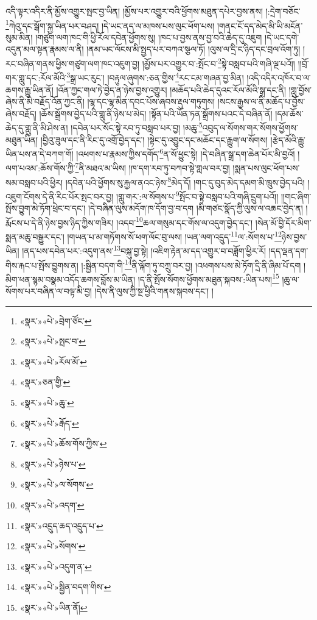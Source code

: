 འདི་ལྟར་འདིར་ནི་མྱོས་འགྱུར་སྤང་བྱ་ཡིན། །མྱོས་པར་འགྱུར་བའི་ཕྱོགས་མཐུན་དཔེར་བྱས་ནས། །:དྲེག་བཅོང་\footnote{«སྣར་»«པེ་»བྲེག་ཙོང་}ཀེའུ་དང་སྒོག་སྐྱ་ཡིན་པར་བཤད། །དེ་ཡང་ནད་ལ་མཁས་པས་ལུང་ཕོག་པས། །གནང་ངོ་དད་མེད་མི་ཡི་མངོན་སུམ་མིན། །གཙུག་ལག་ཁང་གི་ཕྱི་རོལ་དབེན་ཕྱོགས་སུ། །ཁང་པ་བྱས་ནས་བྱ་བའི་ཆེད་དུ་འཇུག །དེ་ཡང་དགེ་འདུན་མལ་སྟན་རྣམས་ལ་ནི། །ནམ་ཡང་ལོངས་མི་སྤྱད་པར་བཀའ་སྩལ་ཏོ། །ལུས་ལ་དྲི་ང་ཉིད་དང་བྲལ་འོག་ཏུ། །རང་བཞིན་གནས་ཕྱིས་གཙུག་ལག་ཁང་འཇུག་བྱ། །མྱོས་པར་འགྱུར་བ་:སྤོང་བ་\footnote{«སྣར་»«པེ་»སྤང་བ་}སྟེ་བསླབ་པའི་གཞི་ལྔ་པའོ།། །།བྲོ་གར་གླུ་དང་:རོལ་མོའི་\footnote{«སྣར་»«པེ་»རོལ་མོ་}སྒྲ་ཡང་རུང་། །བརྟུལ་ཞུགས་:ཅན་གྱིས་\footnote{«སྣར་»ཅན་གྱི་}རང་ངམ་གཞན་བྱ་མིན། །འདི་འདིར་འཁོར་བ་ལ་ཆགས་རྒྱུ་ཡིན་ནོ། །འོན་ཀྱང་གལ་ཏེ་བྱེད་ན་ཉེས་བྱས་འགྱུར། །མཆོད་པའི་ཆེད་དུའང་རོལ་མོའི་སྒྲ་དང་ནི། །གླུ་བྱོས་ཞེས་ནི་མི་བརྗོད་འོན་ཀྱང་ནི། །ལྷ་དང་ལྷ་མིན་དབང་པོས་ཞབས་རྡུལ་གཏུགས། །སངས་རྒྱས་ལ་ནི་མཆོད་པ་བྱོས་ཞེས་བརྗོད། །ཆོས་སྒྲོགས་བྱེད་པའི་གླུ་ནི་ཉེས་པ་མེད། །སྟོན་པའི་ཡོན་ཏན་སྒྲོགས་པའང་དེ་བཞིན་ནོ། །དམ་ཆོས་ཆེད་དུ་གླུ་ནི་མི་ཤེས་ན། །དབེན་པར་སོང་སྟེ་རབ་ཏུ་བསླབ་པར་བྱ། །མཆུ་\footnote{«སྣར་»«པེ་»ཆུ་}འབུད་ལ་སོགས་གར་སོགས་ཕྱོགས་མཐུན་ཡིན། །བྱིའུ་ཟུལ་དང་ནི་རིང་དུ་འགྲོ་བྱེད་དང་། །སྟེང་དུ་འབྱུང་དང་མཆོང་དང་རྒྱུག་ལ་སོགས། །རྩེད་མོའི་རྒྱུ་ཡིན་པས་ན་དེ་བཀག་གོ། །འཕགས་པ་རྣམས་ཀྱིས་དགོད་\footnote{«སྣར་»«པེ་»རྒོད་}ན་སོ་ཕྱུང་སྟེ། །དེ་བཞིན་སྒྲ་དག་ཆེན་པོར་མི་བྱའོ། །ལག་པའམ་:ཆོས་གོས་ཀྱི་\footnote{«སྣར་»«པེ་»ཆོས་གོས་ཀྱིས་}ནི་མཐའ་མ་ཡིས། །ཁ་དག་རབ་ཏུ་བཀབ་སྟེ་གླལ་བར་བྱ། །སྨན་པས་ལུང་ཕོག་པས་སམ་བསླབ་པའི་ཕྱིར། །དབེན་པའི་ཕྱོགས་སུ་རྐྱལ་ནའང་ཉེས་\footnote{«སྣར་»«པེ་»ཉེས་པ་}མེད་དོ། །གང་དུ་བུད་མེད་དམག་མི་ཁྲུས་བྱེད་པའི། །འཇུག་ངོགས་དེ་ནི་རིང་པོར་སྤང་བར་བྱ། །གླུ་གར་:ལ་སོགས་པ་\footnote{«སྣར་»«པེ་»ལ་སོགས་}སྤོང་བ་སྟེ་བསླབ་པའི་གཞི་དྲུག་པའོ།། །།གང་ཞིག་སྤོས་བྱུག་མེ་ཏོག་ཕྲེང་བ་དང་། །དེ་བཞིན་ལུས་མདོག་ཁ་དོག་བྱ་བ་དག །མི་གཙང་སྣོད་ཀྱི་ལུས་ལ་འཆང་བྱེད་ན། །རྨོངས་པ་དེ་ནི་ཉེས་བྱས་ཉིད་ཀྱིས་གཟིར། །འདབ་\footnote{«སྣར་»«པེ་»འདག་}ཆལ་གསུམ་དང་གོས་ལ་འདུག་བྱེད་དང་། །སེན་མོ་བྱི་དོར་མིག་སྨན་མཆུ་བསྒྱུར་དང་། །གཡན་པ་མ་གཏོགས་སོ་ཕག་ལོང་བུ་ལས། །ཡན་ལག་འདྲུད་\footnote{«སྣར་»འདྲུད་ཆད་འདྲུད་པ་}ལ་:སོགས་པ་\footnote{«སྣར་»«པེ་»སོགས་}ཉེས་བྱས་ཡིན། །ནད་པས་དབེན་པར་:འདུག་ནས་\footnote{«སྣར་»«པེ་»འདུག་ན་}བསྐུ་བྱ་སྟེ། །འཇིག་རྟེན་མ་དད་འགྱུར་བ་བཟློག་ཕྱིར་རོ། །དད་ལྡན་དག་གིས་རྐང་པ་སྤོས་བྱུགས་ན། །:སྦྱིན་བདག་གི་\footnote{«སྣར་»«པེ་»སྦྱིན་བདག་གིས་}ནི་ལྐོག་ཏུ་བཀྲུ་བར་བྱ། །འཕགས་པས་མེ་ཏོག་དྲི་ནི་ཞིམ་པོ་དག །མིག་ཕན་སྙམ་བསྣམ་འདོད་ཆགས་བློས་མ་ཡིན། །ད་ནི་སྤོས་སོགས་ཕྱོགས་མཐུན་སྐབས་:ཡིན་པས།\footnote{«སྣར་»«པེ་»ཡིན་ནོ།} །ཆུ་ལ་སོགས་པར་བཞིན་ལ་བལྟ་མི་བྱ། །དེས་ནི་ལུས་ཀྱི་སྔ་ཕྱིའི་གནས་སྐབས་དང་། །
